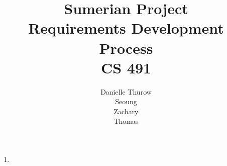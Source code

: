 \documentclass[11pt]{article}
\title{Sumerian Project\\
		Requirements Development Process\\
		CS 491}
\author{Danielle Thurow \\
		  Seoung\\
		  Zachary\\
		  Thomas}
\date{}
\begin{document}
\maketitle

\begin{enumerate}
\item   



\end{enumerate}
\end{document}
